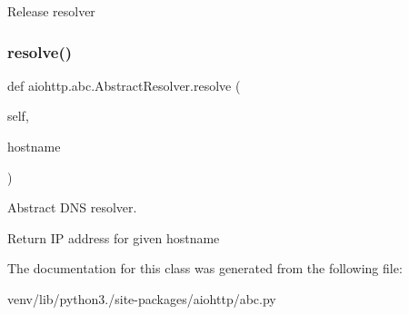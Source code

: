 \begin{DoxyVerb}Release resolver\end{DoxyVerb}
 \mbox{\label{classaiohttp_1_1abc_1_1_abstract_resolver_a9f3621d4f63c3b864bab7084bbff453f}} 
\subsubsection{\texorpdfstring{resolve()}{resolve()}}
{\footnotesize\ttfamily def aiohttp.\+abc.\+Abstract\+Resolver.\+resolve (\begin{DoxyParamCaption}\item[{}]{self,  }\item[{}]{hostname }\end{DoxyParamCaption})}

\begin{DoxyVerb}Abstract DNS resolver.\end{DoxyVerb}
\begin{DoxyVerb}Return IP address for given hostname\end{DoxyVerb}
 

The documentation for this class was generated from the following file\+:\begin{DoxyCompactItemize}
\item 
venv/lib/python3./site-\/packages/aiohttp/abc.\+py\end{DoxyCompactItemize}
